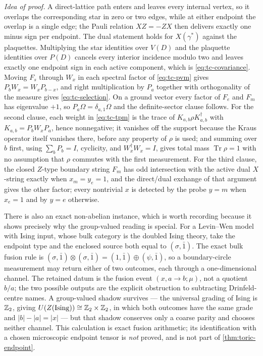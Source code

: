 \emph{Idea of proof.} A direct-lattice path enters and leaves every internal
vertex, so it overlaps the corresponding star in zero or two edges, while at
either endpoint the overlap is a single edge; the Pauli relation $XZ=-ZX$ then
delivers exactly one minus sign per endpoint. The dual statement holds for
$X(\gamma^{*})$ against the plaquettes. Multiplying the star identities over
$V(D)$ and the plaquette identities over $P(D)$ cancels every interior
incidence modulo two and leaves exactly one endpoint sign in each active
component, which is \eqref{eq:tc-covariance}. Moving $F_s$ through $W_x$ in
each spectral factor of \eqref{eq:tc-pvm} gives $P_bW_x=W_xP_{b-x}$, and right
multiplication by $P_a$ together with orthogonality of the measure gives
\eqref{eq:tc-selection}. On a ground vector every factor of $F_e$ and $F_m$
has eigenvalue $+1$, so $P_a\Omega=\delta_{a,1}\Omega$ and the definite-sector
clause follows. For the second clause, each weight in \eqref{eq:tc-tpm} is the
trace of $K_{a,b}\rho K_{a,b}^{\dagger}$ with $K_{a,b}=P_bW_xP_a$, hence
nonnegative; it vanishes off the support because the Kraus operator itself
vanishes there, before any property of $\rho$ is used; and summing over $b$
first, using $\sum_bP_b=I$, cyclicity, and $W_x^{\dagger}W_x=I$, gives total
mass $\operatorname{Tr}\rho=1$ with no assumption that $\rho$ commutes with the
first measurement. For the third clause, the closed $Z$-type boundary string
$F_m$ has odd intersection with the active dual $X$-string exactly when
$x_m=y_e=1$, and the direct/dual exchange of that argument gives the other
factor; every nontrivial $x$ is detected by the probe $y=m$ when $x_e=1$ and
by $y=e$ otherwise.

There is also an exact non-abelian instance, which is worth recording because
it shows precisely why the group-valued reading is special. For a Levin--Wen
model with Ising input, whose bulk category is the doubled Ising theory, take
the endpoint type and the enclosed source both equal to $(\sigma,\bar1)$.
The exact bulk fusion rule is
$(\sigma,\bar1)\otimes(\sigma,\bar1)=(1,\bar1)\oplus(\psi,\bar1)$, so a
boundary-circle measurement may return either of two outcomes, each through a
one-dimensional channel. The retained datum is the fusion event
$(x,a\to b;\mu)$, not a quotient $b/a$; the two possible outputs are the
explicit obstruction to subtracting Drinfeld-centre names. A group-valued
shadow survives --- the universal grading of Ising is $\mathbb{Z}_2$, giving
$U(Z(\mathrm{Ising}))\cong\mathbb{Z}_2\times\mathbb{Z}_2$, in which both outcomes have the same
grade and $|b|-|a|=|x|$ --- but that shadow conserves only a coarse parity and
chooses neither channel. This calculation is exact fusion arithmetic; its
identification with a chosen microscopic endpoint tensor is \emph{not} proved,
and is not part of \cref{thm:toric-endpoint}.

